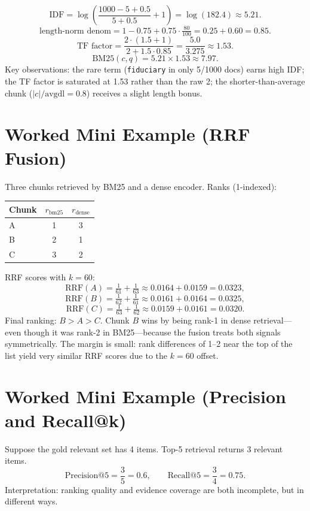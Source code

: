 \[
  \mathrm{IDF} = \log\!\left(\frac{1000 - 5 + 0.5}{5 + 0.5}+1\right)
              = \log(182.4) \approx 5.21.
\]
\[
  \text{length-norm denom} = 1 - 0.75 + 0.75\cdot\tfrac{80}{100} = 0.25 + 0.60 = 0.85.
\]
\[
  \text{TF factor} = \frac{2 \cdot (1.5+1)}{2 + 1.5\cdot 0.85} = \frac{5.0}{3.275} \approx 1.53.
\]
\[
  \mathrm{BM25}(c,q) = 5.21 \times 1.53 \approx 7.97.
\]
Key observations: the rare term (\texttt{fiduciary} in only 5/1000 docs) earns high IDF; the TF factor is saturated at 1.53 rather than the raw 2; the shorter-than-average chunk ($|c|/\mathrm{avgdl}=0.8$) receives a slight length bonus.

\section*{Worked Mini Example (RRF Fusion)}
Three chunks retrieved by BM25 and a dense encoder. Ranks (1-indexed):

\begin{center}
\begin{tabular}{lcc}
Chunk & $r_{\mathrm{bm25}}$ & $r_{\mathrm{dense}}$ \\ \hline
A & 1 & 3 \\
B & 2 & 1 \\
C & 3 & 2 \\
\end{tabular}
\end{center}

RRF scores with $k=60$:
\[
  \mathrm{RRF}(A) = \tfrac{1}{61} + \tfrac{1}{63} \approx 0.0164 + 0.0159 = 0.0323,
\]
\[
  \mathrm{RRF}(B) = \tfrac{1}{62} + \tfrac{1}{61} \approx 0.0161 + 0.0164 = 0.0325,
\]
\[
  \mathrm{RRF}(C) = \tfrac{1}{63} + \tfrac{1}{62} \approx 0.0159 + 0.0161 = 0.0320.
\]
Final ranking: $B > A > C$. Chunk $B$ wins by being rank-1 in dense retrieval---even though it was rank-2 in BM25---because the fusion treats both signals symmetrically. The margin is small: rank differences of 1--2 near the top of the list yield very similar RRF scores due to the $k=60$ offset.

\section*{Worked Mini Example (Precision and Recall@k)}
Suppose the gold relevant set has 4 items. Top-5 retrieval returns 3 relevant items.
\[
\mathrm{Precision@5}=\frac{3}{5}=0.6,\qquad
\mathrm{Recall@5}=\frac{3}{4}=0.75.
\]
Interpretation: ranking quality and evidence coverage are both incomplete, but in different ways.

